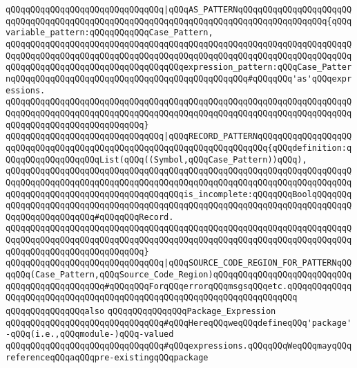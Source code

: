\verb|qQQqqQQqqQQqqQQqqQQqqQQqqQQqqQQq|\verb#|qQQqAS_PATTERNqQQqqQQqqQQqqQQqqQQqqQQqqQQqqQQqqQQqqQQqqQQqqQQqqQQqqQQqqQQqqQQqqQQqqQQqqQQqqQQqqQQqqQQq{qQQqvariable_pattern:qQQqqQQqqQQqCase_Pattern,#\newline
\verb|qQQqqQQqqQQqqQQqqQQqqQQqqQQqqQQqqQQqqQQqqQQqqQQqqQQqqQQqqQQqqQQqqQQqqQQqqQQqqQQqqQQqqQQqqQQqqQQqqQQqqQQqqQQqqQQqqQQqqQQqqQQqqQQqqQQqqQQqqQQqqQQqqQQqqQQqqQQqqQQqqQQqqQQqqQQqqQQqexpression_pattern:qQQqCase_PatternqQQqqQQqqQQqqQQqqQQqqQQqqQQqqQQqqQQqqQQqqQQqqQQq#qQQqqQQq'as'qQQqexpressions.|\newline
\verb|qQQqqQQqqQQqqQQqqQQqqQQqqQQqqQQqqQQqqQQqqQQqqQQqqQQqqQQqqQQqqQQqqQQqqQQqqQQqqQQqqQQqqQQqqQQqqQQqqQQqqQQqqQQqqQQqqQQqqQQqqQQqqQQqqQQqqQQqqQQqqQQqqQQqqQQqqQQqqQQqqQQqqQQq}|\newline
\verb|qQQqqQQqqQQqqQQqqQQqqQQqqQQqqQQq|\verb#|qQQqRECORD_PATTERNqQQqqQQqqQQqqQQqqQQqqQQqqQQqqQQqqQQqqQQqqQQqqQQqqQQqqQQqqQQqqQQqqQQqqQQq{qQQqdefinition:qQQqqQQqqQQqqQQqqQQqList(qQQq((Symbol,qQQqCase_Pattern))qQQq),#\newline
\verb|qQQqqQQqqQQqqQQqqQQqqQQqqQQqqQQqqQQqqQQqqQQqqQQqqQQqqQQqqQQqqQQqqQQqqQQqqQQqqQQqqQQqqQQqqQQqqQQqqQQqqQQqqQQqqQQqqQQqqQQqqQQqqQQqqQQqqQQqqQQqqQQqqQQqqQQqqQQqqQQqqQQqqQQqqQQqqQQqis_incomplete:qQQqqQQqBoolqQQqqQQqqQQqqQQqqQQqqQQqqQQqqQQqqQQqqQQqqQQqqQQqqQQqqQQqqQQqqQQqqQQqqQQqqQQqqQQqqQQqqQQqqQQqqQQq#qQQqqQQqRecord.|\newline
\verb|qQQqqQQqqQQqqQQqqQQqqQQqqQQqqQQqqQQqqQQqqQQqqQQqqQQqqQQqqQQqqQQqqQQqqQQqqQQqqQQqqQQqqQQqqQQqqQQqqQQqqQQqqQQqqQQqqQQqqQQqqQQqqQQqqQQqqQQqqQQqqQQqqQQqqQQqqQQqqQQqqQQqqQQq}|\newline
\verb|qQQqqQQqqQQqqQQqqQQqqQQqqQQqqQQq|\verb#|qQQqSOURCE_CODE_REGION_FOR_PATTERNqQQqqQQq(Case_Pattern,qQQqSource_Code_Region)qQQqqQQqqQQqqQQqqQQqqQQqqQQqqQQqqQQqqQQqqQQqqQQq#\verb|#qQQqqQQqForqQQqerrorqQQqmsgsqQQqetc.qQQqqQQqqQQqqQQqqQQqqQQqqQQqqQQqqQQqqQQqqQQqqQQqqQQqqQQqqQQqqQQqqQQqqQQq|\newline
\newline
\newline
\newline
\verb|qQQqqQQqqQQqqQQqalso|\newline
\verb|qQQqqQQqqQQqqQQqPackage_Expression|\newline
\newline
\verb|qQQqqQQqqQQqqQQqqQQqqQQqqQQqqQQq#qQQqHereqQQqweqQQqdefineqQQq'package'-qQQq(i.e.,qQQqmodule-)qQQq-valued|\newline
\verb|qQQqqQQqqQQqqQQqqQQqqQQqqQQqqQQq#qQQqexpressions.qQQqqQQqWeqQQqmayqQQqreferenceqQQqaqQQqpre-existingqQQqpackage|\newline
